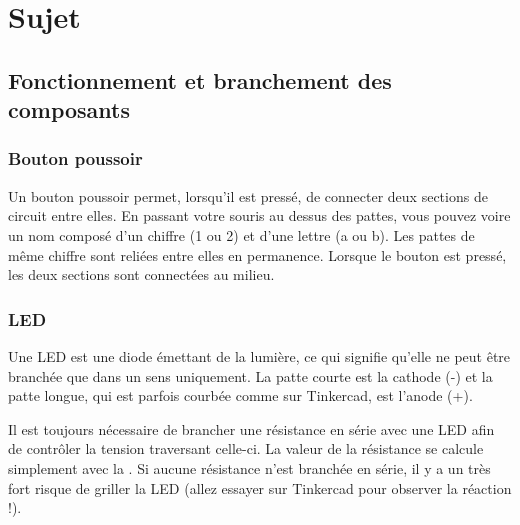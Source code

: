 \section{Sujet}

\subsection{Fonctionnement et branchement des composants}

\subsubsection{Bouton poussoir}

Un bouton poussoir permet, lorsqu'il est pressé, de connecter deux sections de circuit entre elles.
En passant votre souris au dessus des pattes, vous pouvez voire un nom composé d'un chiffre (1 ou 2) et d'une lettre (a ou b).
Les pattes de même chiffre sont reliées entre elles en permanence.
Lorsque le bouton est pressé, les deux sections sont connectées au milieu.


\subsubsection{LED}

Une LED est une diode émettant de la lumière, ce qui signifie qu'elle ne peut être branchée que dans un sens uniquement.
La patte courte est la cathode (-) et la patte longue, qui est parfois courbée comme sur Tinkercad, est l'anode (+).

Il est toujours nécessaire de brancher une résistance en série avec une LED afin de contrôler la tension traversant celle-ci.
La valeur de la résistance se calcule simplement avec la .
Si aucune résistance n'est branchée en série, il y a un très fort risque de griller la LED (allez essayer sur Tinkercad pour observer la réaction !).


